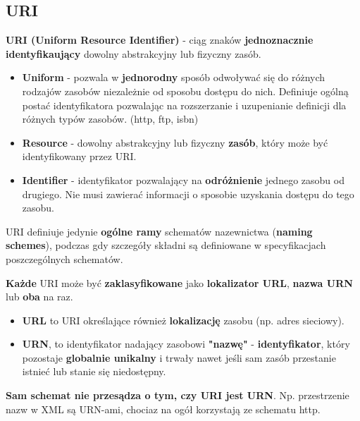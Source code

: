 \documentclass[../main.tex]{subfiles}
\begin{document}
    \subsection{URI}
    \textbf{URI (Uniform Resource Identifier)} - ciąg znaków \textbf{jednoznacznie identyfikaujący} dowolny abstrakcyjny lub fizyczny zasób.
    \begin{itemize}
        \item \textbf{Uniform} - pozwala w \textbf{jednorodny} sposób odwoływać się do różnych rodzajów zasobów niezależnie od sposobu dostępu do nich. Definiuje ogólną postać identyfikatora pozwalając na rozszerzanie i uzupenianie definicji dla różnych typów zasobów. (http, ftp, isbn)
        \item \textbf{Resource} - dowolny abstrakcyjny lub fizyczny \textbf{zasób}, który może być identyfikowany przez URI.
        \item \textbf{Identifier} - identyfikator pozwalający na \textbf{odróżnienie} jednego zasobu od drugiego. Nie musi zawierać informacji o sposobie uzyskania dostępu do tego zasobu.
    \end{itemize}
    URI definiuje jedynie \textbf{ogólne ramy} schematów nazewnictwa (\textbf{naming schemes}), podczas gdy szczegóły składni są
    definiowane w specyfikacjach poszczególnych schematów.

    \textbf{Każde} URI może być \textbf{zaklasyfikowane} jako \textbf{lokalizator URL}, \textbf{nazwa URN} lub
    \textbf{oba} na raz.

    \begin{itemize}
        \item \textbf{URL} to URI określające również \textbf{lokalizację} zasobu (np. adres sieciowy).
        \item \textbf{URN}, to identyfikator nadający zasobowi \textbf{"nazwę"} - \textbf{identyfikator}, który pozostaje \textbf{globalnie unikalny} i trwały nawet
        jeśli sam zasób przestanie istnieć lub stanie się niedostępny.
    \end{itemize}
    \textbf{Sam schemat nie przesądza o tym, czy URI jest URN}. Np. przestrzenie nazw w XML są URN-ami, chociaz na ogół
    korzystają ze schematu http.
\end{document}
